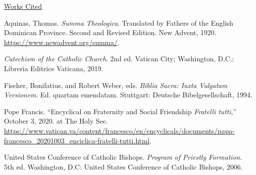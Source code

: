 \documentclass[
    12pt,
    letterpaper,
    oneside,
    noraggedright
]{turabian-researchpaper}
\newlength{\cslhangindent}
\newenvironment{CSLReferences}[2]
 {
\newpage %
\centerline{\underline{Works Cited}} %
 \setlength{\parindent}{0pt}
 \singlespacing
  \let\oldpar\par
  \def\par{\hangindent=\cslhangindent\oldpar}
  \setlength{\parskip}{1em}
 }
{
}
\begin{document}
\hypertarget{refs}{}
\begin{CSLReferences}{1}{0}
\leavevmode{}%
Aquinas, Thomas. \emph{Summa Theologica}. Translated by Fathers of the
English Dominican Province. Second and Revised Edition. New Advent,
1920. \url{https://www.newadvent.org/summa/}.

\leavevmode{}%
\emph{Catechism of the Catholic Church}. 2nd ed. Vatican City;
Washington, D.C.: Libreria Editrice Vaticana, 2019.

\leavevmode{}%
Fischer, Bonifatius, and Robert Weber, eds. \emph{Biblia Sacra: Iuxta
Vulgatam Versionem}. Ed. quartam emendatam. Stuttgart: Deutsche
Bibelgesellschaft, 1994.

\leavevmode{}%
Pope Francis. {``Encyclical on Fraternity and Social Friendship
\emph{Fratelli tutti},''} October 3, 2020. at The Holy See.
\url{https://www.vatican.va/content/francesco/en/encyclicals/documents/papa-francesco_20201003_enciclica-fratelli-tutti.html}.

\leavevmode{}%
United States Conference of Catholic Bishops. \emph{Program of Priestly
Formation}. 5th ed. Washington, D.C: United States Conference of
Catholic Bishops, 2006.

\end{CSLReferences}
\end{document}
